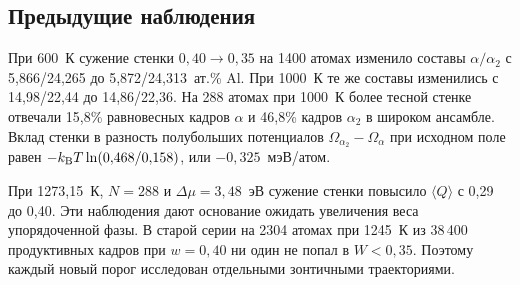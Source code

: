 \subsection*{Предыдущие наблюдения}
При 600~К сужение стенки \(0{,}40\to0{,}35\) на 1400 атомах изменило составы \(\alpha/\alpha_2\) с 5,866/24,265 до 5,872/24,313~ат.\% Al. При 1000~К те же составы изменились с 14,98/22,44 до 14,86/22,36. На 288 атомах при 1000~К более тесной стенке отвечали 15,8\% равновесных кадров \(\alpha\) и 46,8\% кадров \(\alpha_2\) в широком ансамбле. Вклад стенки в разность полубольших потенциалов \(\Omega_{\alpha_2}-\Omega_{\alpha}\) при исходном поле равен \(-k_{\rm B}T\ln(0{,}468/0{,}158)\), или \(-0{,}325\)~мэВ/атом.

При 1273,15~К, \(N=288\) и \(\Delta\mu=3{,}48\)~эВ сужение стенки повысило \(\langle Q\rangle\) с 0,29 до 0,40. Эти наблюдения дают основание ожидать увеличения веса упорядоченной фазы. В старой серии на 2304 атомах при 1245~К из 38\,400 продуктивных кадров при \(w=0{,}40\) ни один не попал в \(W<0{,}35\). Поэтому каждый новый порог исследован отдельными зонтичными траекториями.
